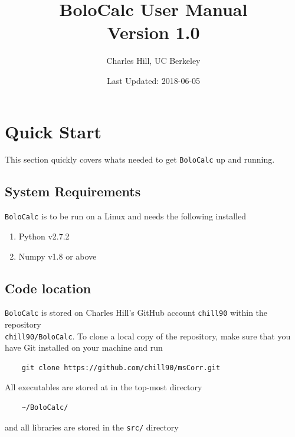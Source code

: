 \documentclass[11pt]{article} %
\title{BoloCalc User Manual \\ Version 1.0}
\author{Charles Hill, UC Berkeley}
\date{Last Updated: 2018-06-05}
\begin{document}
\maketitle

\tableofcontents
\pagebreak


\section{Quick Start}
\label{sec:quick}

This section quickly covers whats needed to get \texttt{BoloCalc} up and running.


\subsection{System Requirements}
\label{sec:sysreq}

\texttt{BoloCalc} is to be run on a Linux and needs the following installed

\begin{enumerate}
\item Python v2.7.2
\item Numpy v1.8 or above
\end{enumerate}


\subsection{Code location}
\label{sec:source}

\texttt{BoloCalc} is stored on Charles Hill's GitHub account \texttt{chill90} within the repository \\ \texttt{chill90/BoloCalc}. To clone a local copy of the repository, make sure that you have Git installed on your machine and run

\begin{lstlisting}
	git clone https://github.com/chill90/msCorr.git
\end{lstlisting}

All executables are stored at in the top-most directory

\begin{lstlisting}
	~/BoloCalc/
\end{lstlisting}

and all libraries are stored in the \texttt{src/} directory
\end{document}
